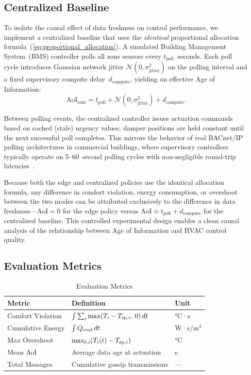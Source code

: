 \documentclass[conference]{IEEEtran}
\begin{document}
\subsection{Centralized Baseline}

To isolate the causal effect of data freshness on control performance, we implement a centralized baseline that uses the \textit{identical} proportional allocation formula~(\ref{eq:proportional_allocation}). A simulated Building Management System~(BMS) controller polls all zone sensors every $t_{\text{poll}}$~seconds. Each poll cycle introduces Gaussian network jitter $\mathcal{N}(0, \sigma_{\text{jitter}}^2)$ on the polling interval and a fixed supervisory compute delay~$d_{\text{compute}}$, yielding an effective Age of Information:
\begin{equation}
    \text{AoI}_{\text{cent}} = t_{\text{poll}} + \mathcal{N}(0, \sigma_{\text{jitter}}^2) + d_{\text{compute}}.
    \label{eq:aoi_centralized}
\end{equation}

Between polling events, the centralized controller issues actuation commands based on cached (stale) urgency values; damper positions are held constant until the next successful poll completes. This mirrors the behavior of real BACnet/IP polling architectures in commercial buildings, where supervisory controllers typically operate on 5--60~second polling cycles with non-negligible round-trip latencies~\cite{bacnet2016}.

Because both the edge and centralized policies use the identical allocation formula, any difference in comfort violation, energy consumption, or overshoot between the two modes can be attributed exclusively to the difference in data freshness---$\text{AoI} = 0$ for the edge policy versus $\text{AoI} \approx t_{\text{poll}} + d_{\text{compute}}$ for the centralized baseline. This controlled experimental design enables a clean causal analysis of the relationship between Age of Information and HVAC control quality.

\subsection{Evaluation Metrics}
\begin{table}[t]
\centering
\caption{Evaluation Metrics}
\label{tab:metrics}
\begin{tabular}{lll}
\toprule
\textbf{Metric} & \textbf{Definition} & \textbf{Unit} \\
\midrule
Comfort Violation & $\int \sum_i \max(T_i - T_{{\rm sp},i},\, 0)\, dt$ & °C·s \\
Cumulative Energy & $\int Q_{\rm cool}\, dt$ & W·s/m$^3$ \\
Max Overshoot     & $\max_{t,i}(T_i(t) - T_{{\rm sp},i})$ & °C \\
Mean AoI          & Average data age at actuation & s \\
Total Messages    & Cumulative gossip transmissions & --- \\
\bottomrule
\end{tabular}
\end{table}
\end{document}
